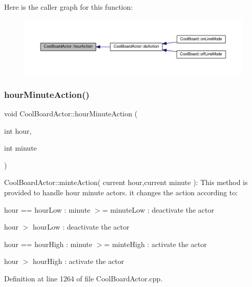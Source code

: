 Here is the caller graph for this function\+:
\nopagebreak
\begin{figure}[H]
\begin{center}
\leavevmode
\includegraphics[width=350pt]{dc/d69/class_cool_board_actor_adf3b4e15b9d73681082112adf8ef95cb_icgraph}
\end{center}
\end{figure}
\mbox{\label{class_cool_board_actor_a1eb1fbca19bc80aad20d2686d52317f8}} 
\subsubsection{\texorpdfstring{hour\+Minute\+Action()}{hourMinuteAction()}}
{\footnotesize\ttfamily void Cool\+Board\+Actor\+::hour\+Minute\+Action (\begin{DoxyParamCaption}\item[{int}]{hour,  }\item[{int}]{minute }\end{DoxyParamCaption})}

Cool\+Board\+Actor\+::minte\+Action( current hour,current minute )\+: This method is provided to handle hour minute actors. it changes the action according to\+:

hour == hour\+Low \+: minute $>$= minute\+Low \+: deactivate the actor

hour $>$ hour\+Low \+: deactivate the actor

hour == hour\+High \+: minute $>$= minte\+High \+: activate the actor

hour $>$ hour\+High \+: activate the actor 

Definition at line 1264 of file Cool\+Board\+Actor.\+cpp.



